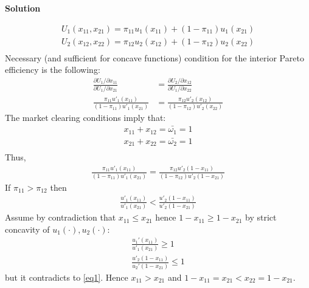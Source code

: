 \documentclass[a4paper]{article}
\begin{document}
\textbf{Solution}

\begin{align*}
U_1(x_{11}, x_{21}) = \pi_{11}u_1(x_{11}) + (1 - \pi_{11}) u_1(x_{21})\\
U_2(x_{12}, x_{22}) = \pi_{12}u_2(x_{12}) + (1 - \pi_{12}) u_2(x_{22})\\
\end{align*}
Necessary (and sufficient for concave functions) condition for the interior Pareto efficiency is the following:
\begin{align*}
\frac{\partial U_1/\partial x_{11}}{\partial U_1/\partial x_{21}} &= \frac{\partial U_2/\partial x_{12}}{\partial U_1/\partial x_{22}}\\
\frac{\pi_{11}u'_1(x_{11})}{(1-\pi_{11})u'_1(x_{21})} &= \frac{\pi_{12}u'_2(x_{12})}{(1-\pi_{12})u'_2(x_{22})}
\end{align*}
The market clearing conditions imply that:
\begin{align*}
x_{11} + x_{12} = \bar{\omega_1} = 1\\
x_{21} + x_{22} = \bar{\omega_2} = 1\\
\end{align*}
Thus, 
\begin{align*}
\frac{\pi_{11}u'_1(x_{11})}{(1-\pi_{11})u'_1(x_{21})} = \frac{\pi_{12}u'_2(1 - x_{11})}{(1-\pi_{12})u'_2(1-x_{21})}
\end{align*}
If $\pi_{11} > \pi_{12}$ then 
\begin{align}\label{eq1}
\frac{u'_1(x_{11})}{u'_1(x_{21})} < \frac{u'_2(1-x_{11})}{u'_2(1 - x_{21})}
\end{align}
Assume by contradiction that $x_{11} \le x_{21}$ hence $1-x_{11} \ge 1 - x_{21}$ by strict concavity of $u_1(\cdot), u_2(\cdot)$:
\begin{align*}
\frac{u_1'(x_{11})}{u'_1(x_{21})} \ge 1\\
\frac{u'_2(1 - x_{11})}{u_2'(1 - x_{21})} \le 1
\end{align*}
but it contradicts to \eqref{eq1}. Hence $x_{11} > x_{21}$ and $1 - x_{11} = x_{21} < x_{22} = 1 - x_{21}$.
\end{document}
